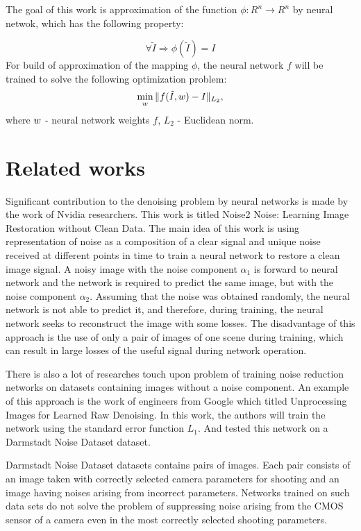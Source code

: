 \documentclass[runningheads]{llncs}
\begin{document}
The goal of this work is approximation of the function $\phi: \mathit{R}^n \longrightarrow  \mathit{R}^n$ by neural netwok, which has the following property:

\begin{equation}\label{eq:main_property}
\forall \tilde{I} \Longrightarrow \phi(\tilde{I}) = I 
\end{equation}
For build of approximation of the mapping $\phi$, the neural network $f$ will be trained to solve the following optimization problem:
\begin{eqnarray}\label{eq:main_min_task}
\min_{\mathnormal{w}} \Arrowvert f(\tilde{I}, \mathnormal{w}) - I \Arrowvert_{L_2}\mathit{ ,}
\end{eqnarray}
where $\mathnormal{w}$ - neural network weights $f$, $L_2$ - Euclidean norm.


\section{Related works}
Significant contribution to the denoising problem by neural networks is made by the work of Nvidia researchers. This work is titled Noise2 Noise: Learning Image Restoration without Clean Data. The main idea of this work is using representation of noise as a composition of a clear signal and unique noise received at different points in time to train a neural network to restore a clean image signal. A noisy image with the noise component $\alpha_1$ is forward to neural network and the network is required to predict the same image, but with the noise component $\alpha_2$. Assuming that the noise was obtained randomly, the neural network is not able to predict it, and therefore, during training, the neural network seeks to reconstruct the image with some losses. The disadvantage of this approach is the use of only a pair of images of one scene during training, which can result in large losses of the useful signal during network operation.

There is also a lot of researches touch upon problem of training noise reduction networks on datasets containing images without a noise component. An example of this approach is the work of engineers from Google which titled Unprocessing Images for Learned Raw Denoising. In this work, the authors will train the network using the standard error function $L_1$. And tested this network on a Darmstadt Noise Dataset dataset.

Darmstadt Noise Dataset datasets contains pairs of images. Each pair consists of an image taken with correctly selected camera parameters for shooting and an image having noises arising from incorrect parameters. Networks trained on such data sets do not solve the problem of suppressing noise arising from the CMOS sensor of a camera even in the most correctly selected shooting parameters.
\end{document}
